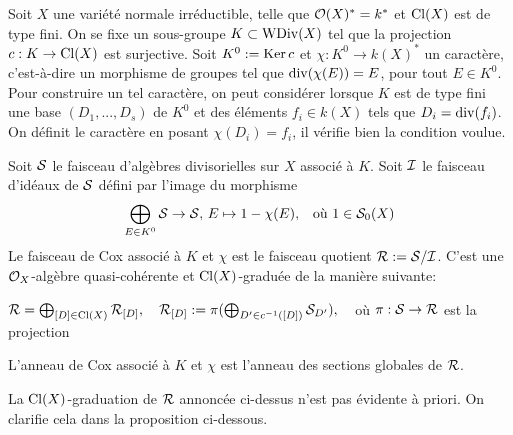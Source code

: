 \begin{cons}\label{conscoxtorsion}
Soit $X$ une variété normale irréductible, telle que $\mathcal{O}(X)^*=k^*$ et $\operatorname{Cl}(X)$ est de type fini. On se fixe un sous-groupe $K\subset \operatorname{WDiv}(X)$ tel que la projection $c:K\rightarrow \operatorname{Cl}(X)$ est surjective. Soit $K^0:=\operatorname{Ker} c$ et $\chi:K^0\rightarrow k(X)^*$ un caractère, c'est-à-dire un morphisme de groupes tel que $\operatorname{div}(\chi(E))=E$, pour tout $E\in K^0$. Pour construire un tel caractère, on peut considérer lorsque $K$ est de type fini une base $(D_1,...,D_s)$ de $K^0$ et des éléments $f_i\in k(X)$ tels que $D_i=\operatorname{div}(f_i)$. On définit le caractère en posant $\chi(D_i)=f_i$, il vérifie bien la condition voulue.

Soit $\mathcal{S}$ le faisceau d'algèbres divisorielles sur $X$ associé à $K$. Soit $\mathcal{I}$ le faisceau d'idéaux de $\mathcal{S}$ défini par l'image du morphisme 
$$\bigoplus_{E\in K^0}\mathcal{S}\rightarrow \mathcal{S},\, E\mapsto 1-\chi(E),\,\,\, \text{ où }1\in \mathcal{S}_0(X)$$
Le faisceau de Cox associé à $K$ et $\chi$ est le faisceau quotient $\mathcal{R}:=\mathcal{S}/\mathcal{I}$. C'est une $\mathcal{O}_X$-algèbre quasi-cohérente et $\operatorname{Cl}(X)$-graduée de la manière suivante: 
\begin{center}
$\mathcal{R}=\bigoplus_{[D]\in \operatorname{Cl}(X)}\mathcal{R}_{[D]},\,\,\,\,\,\, \mathcal{R}_{[D]}:=\pi(\bigoplus_{D'\in c^{-1}([D])}\mathcal{S}_{D'}),\,\,\,\,\,$ où $\pi:\mathcal{S}\rightarrow \mathcal{R}$ est la projection
\end{center}

\noindent L'anneau de Cox associé à $K$ et $\chi$ est l'anneau des sections globales de $\mathcal{R}$.
\end{cons}

La $\operatorname{Cl}(X)$-graduation de $\mathcal{R}$ annoncée ci-dessus n'est pas évidente à priori. On clarifie cela dans la proposition ci-dessous.

